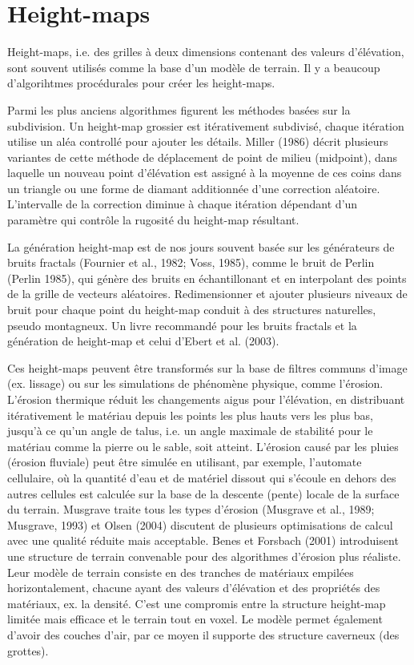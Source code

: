 \documentclass[11pt]{report}
\begin{document}
\section{Height-maps}

Height-maps, i.e. des grilles à deux dimensions contenant des valeurs d'élévation, sont souvent utilisés comme la base d'un modèle de terrain. Il y a beaucoup d'algorihtmes procédurales pour créer les height-maps. \newline

Parmi les plus anciens algorithmes figurent les méthodes basées sur la subdivision. Un height-map grossier est itérativement subdivisé, chaque itération utilise un aléa controllé pour ajouter les détails. Miller (1986) décrit plusieurs variantes de cette méthode de déplacement de point de milieu (midpoint), dans laquelle un nouveau point d'élévation est assigné à la moyenne de ces coins dans un triangle ou une forme de diamant additionnée d'une correction aléatoire. L'intervalle de la correction diminue à chaque itération dépendant d'un paramètre qui contrôle la rugosité du height-map résultant. \newline

La génération height-map est de nos jours souvent basée sur les générateurs de bruits fractals (Fournier et al., 1982; Voss, 1985), comme le bruit de Perlin (Perlin 1985), qui génère des bruits en échantillonant et en interpolant des points de la grille de vecteurs aléatoires. Redimensionner et ajouter plusieurs niveaux de bruit pour chaque point du height-map conduit à des structures naturelles, pseudo montagneux. Un livre recommandé pour les bruits fractals et la génération de height-map et celui d'Ebert et al. (2003).\newline

Ces height-maps peuvent être transformés sur la base de filtres  communs d'image (ex. lissage) ou sur les simulations de phénomène physique, comme l'érosion. L'érosion thermique réduit les changements aigus pour l'élévation, en distribuant itérativement le matériau depuis les points les plus hauts vers les plus bas, jusqu'à ce qu'un angle de talus, i.e. un angle maximale de stabilité pour le matériau comme la pierre ou le sable, soit atteint. L'érosion causé par les pluies (érosion fluviale) peut être simulée en utilisant, par exemple, l'automate cellulaire, où la quantité d'eau et de matériel dissout qui s'écoule en dehors des  autres cellules est calculée sur la base de la descente (pente) locale de la surface du terrain. Musgrave traite tous les types d'érosion (Musgrave et al., 1989; Musgrave, 1993) et Olsen (2004) discutent de plusieurs optimisations de calcul avec une qualité réduite mais acceptable. Benes et Forsbach (2001) introduisent une structure de terrain convenable pour des algorithmes d'érosion plus réaliste. Leur modèle de terrain consiste en des tranches de matériaux empilées horizontalement, chacune ayant des valeurs d'élévation et des propriétés des matériaux, ex. la densité. C'est une compromis entre la structure height-map limitée mais efficace et le terrain tout en voxel. Le modèle permet également d'avoir des couches d'air, par ce moyen il supporte des structure caverneux (des grottes). \newline
\end{document}
